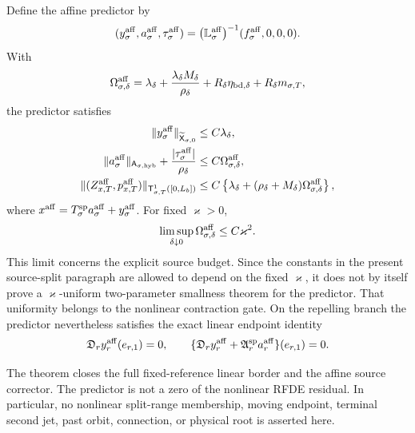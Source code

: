 \begin{theorem}
Define the affine predictor by
\begin{equation}
 (y_\sigma^{\rm aff},a_\sigma^{\rm aff},
       \tau_\sigma^{\rm aff})
 =\bigl(\mathbb L_\sigma^{\rm aff}\bigr)^{-1}
       (f_\sigma^{\rm aff},0,0,0).              \label{eq:affine-endpoint-predictor}
\end{equation}
With
\begin{equation}
 \Omega_{\sigma,\delta}^{\rm aff}
 =\lambda_\delta
   +\frac{\lambda_\delta M_\delta}{\rho_\delta}
   +R_\delta\eta_{{\rm bd},\delta}
   +R_\delta m_{\sigma,T},                       \label{eq:affine-predictor-small-number}
\end{equation}
the predictor satisfies
\begin{align}
 \|y_\sigma^{\rm aff}\|_{\widetilde{\mathsf X}_{\sigma,0}}
 &\le C\lambda_\delta,\notag\\
 \|a_\sigma^{\rm aff}\|_{\mathsf A_{\sigma,\mathrm{hyb}}}
 +\frac{|\tau_\sigma^{\rm aff}|}{\rho_\delta}
 &\le C\Omega_{\sigma,\delta}^{\rm aff},       \label{eq:affine-predictor-phase-slack-bound}\\
 \|(Z_{x,T}^{\rm aff},p_{x,T}^{\rm aff})\|_
       {\mathsf T_{\sigma,T}^1([0,L_b])}
 &\le C\left\{\lambda_\delta
       +(\rho_\delta+M_\delta)
             \Omega_{\sigma,\delta}^{\rm aff}\right\},   \label{eq:affine-predictor-terminal-bound}
\end{align}
where \(x^{\rm aff}=T_\sigma^{\rm sp}a_\sigma^{\rm aff}
+y_\sigma^{\rm aff}\).  For fixed \(\varkappa>0\),
\begin{equation}
 \limsup_{\delta\downarrow0}
   \Omega_{\sigma,\delta}^{\rm aff}
 \le C\varkappa^2.                              \label{eq:affine-explicit-budget-limit}
\end{equation}
This limit concerns the explicit source budget.  Since the constants in
the present source-split paragraph are allowed to depend on the fixed
\(\varkappa\), it does not by itself prove a
\(\varkappa\)-uniform two-parameter smallness theorem for the predictor.
That uniformity belongs to the nonlinear contraction gate.  On the
repelling branch the predictor nevertheless satisfies the exact linear
endpoint identity
\begin{equation}
 \mathfrak D_ry_r^{\rm aff}(e_{r,1})=0,\qquad
 \{\mathfrak D_ry_r^{\rm aff}
       +\mathfrak A_r^{\rm sp}a_r^{\rm aff}\}(e_{r,1})=0.
                                                        \label{eq:affine-predictor-speed-row}
\end{equation}

The theorem closes the full fixed-reference linear border and the affine
source corrector.  The predictor is not a zero of the nonlinear RFDE
residual.  In particular, no nonlinear split-range membership, moving
endpoint, terminal second jet, past orbit, connection, or physical root is
asserted here.
\end{theorem}

